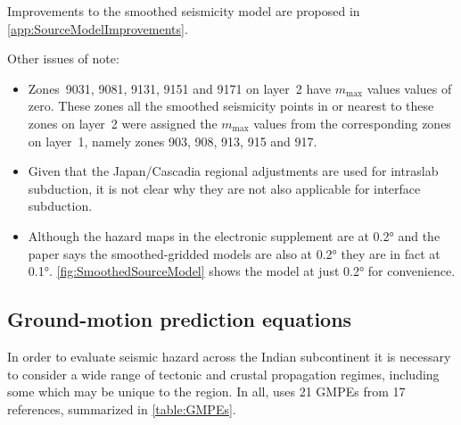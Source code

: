 \documentclass{article}
\begin{document}
Improvements to the smoothed seismicity model are proposed in \autoref{app:SourceModelImprovements}.

Other issues of note:
\begin{itemize}
\item Zones~9031, 9081, 9131, 9151 and 9171 on layer~2 have $m_\text{max}$ values values of zero.
These zones all the smoothed seismicity points in or nearest to these zones on layer~2 were assigned the $m_\text{max}$ values from the corresponding zones on layer~1, namely zones 903, 908, 913, 915 and 917.
\item Given that the Japan/Cascadia regional adjustments are used for intraslab subduction, it is not clear why they are not also applicable for interface subduction.
\item Although the hazard maps in the electronic supplement are at 0.2° and the paper says the smoothed-gridded models are also at 0.2° they are in fact at 0.1°.
\autoref{fig:SmoothedSourceModel} shows the model at just 0.2° for convenience.
\end{itemize}

\subsection{Ground-motion prediction equations}
\label{subsec:GMPEs}

In order to evaluate seismic hazard across the Indian subcontinent it is necessary to consider a wide range of tectonic and crustal propagation regimes, including some which may be unique to the region. 
In all, \cite{nath2012probabilistic} uses 21 GMPEs from 17 references, summarized in \autoref{table:GMPEs}. 
\end{document}

